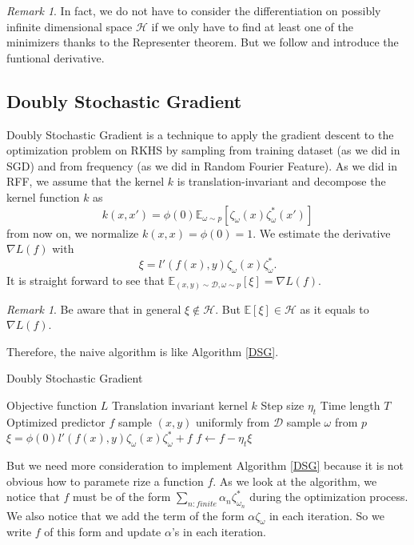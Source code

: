 \documentclass{amsart}
\theoremstyle{definition}
\theoremstyle{remark}
\newtheorem{remark}[theorem]{Remark}
\numberwithin{equation}{section}
\begin{document}
\begin{remark}
In fact, we do not have to consider the differentiation on possibly infinite dimensional space $\mathcal{H}$ if we only have to find at least one of the minimizers thanks to the Representer theorem. But we follow \cite{dai2014scalable} and introduce the funtional derivative.
\end{remark}

\subsection{Doubly Stochastic Gradient}

Doubly Stochastic Gradient \cite{dai2014scalable} is a technique to apply the gradient descent to the optimization problem on RKHS by sampling from training dataset (as we did in SGD) and from frequency (as we did in Random Fourier Feature).
As we did in RFF, we assume that the kernel $k$ is translation-invariant and decompose the kernel function $k$ as
\begin{equation}
k(x, x') = \phi(0) \mathbb{E}_{\omega \sim p} \left[ \zeta_\omega(x) \zeta_\omega^{\ast}(x')\right]
\end{equation}
from now on, we normalize $k(x, x) = \phi(0) = 1$.
We estimate the derivative $\nabla L(f)$ with 
\begin{equation}
\xi = l'(f(x), y)\zeta_\omega(x)\zeta_\omega^{\ast}.
\end{equation}
It is straight forward to see that $\mathbb{E}_{(x, y)\sim \mathcal{D}, \omega \sim p} \left[\xi\right] = \nabla L(f)$.

\begin{remark}
Be aware that in general $\xi \not \in \mathcal{H}$. But $\mathbb{E}[\xi] \in \mathcal{H}$ as it equals to $\nabla L(f)$.
\end{remark}
Therefore, the naive algorithm is like Algorithm \ref{DSG}.
\begin{algorithm}\label{DSG}
\caption{Doubly Stochastic Gradient}
\begin{algorithmic}
\REQUIRE Objective function $L$
\REQUIRE Translation invariant kernel $k$
\REQUIRE Step size $\eta_t$
\REQUIRE Time length $T$
\ENSURE Optimized predictor $f$
\STATE sample $(x, y)$ uniformly from $\mathcal{D}$
\STATE sample $\omega$ from $p$
\STATE $\xi = \phi(0) l'(f(x), y)\zeta_\omega(x)\zeta_\omega^{\ast} + f$
\STATE $f \leftarrow f - \eta_t \xi$
\ENDFOR
\end{algorithmic}
\end{algorithm}
But we need more consideration to implement Algorithm \ref{DSG} because it is not obvious how to paramete
rize a function $f$.
As we look at the algorithm, we notice that $f$ must be of the form $\sum_{n:finite} \alpha_n \zeta_{\omega_n}^{\ast}$ during the optimization process.
We also notice that we add the term of the form $\alpha \zeta_{\omega} $ in each iteration. So we write $f$ of this form and update $\alpha$'s in each iteration.
\end{document}
